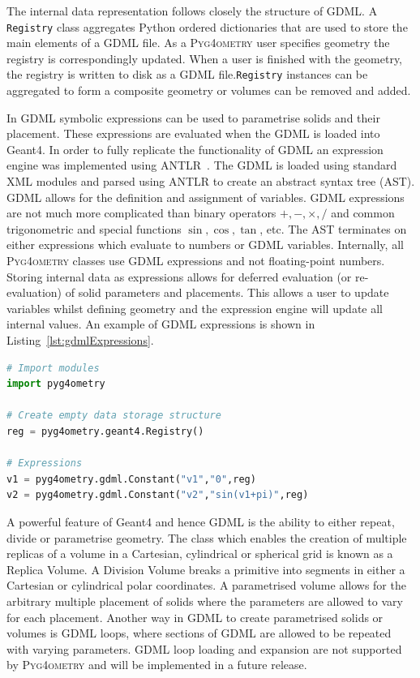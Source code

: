 \documentclass[final,5p,times,twocolumn]{elsarticle}
\newcommand{\PYGEOMETRY}{\textsc{Pyg4ometry}}
\begin{document}
The internal data representation follows closely the structure of GDML. A \verb|Registry| class aggregates Python ordered dictionaries that are  used to store the main 
elements of a GDML file. As a \PYGEOMETRY{} user specifies geometry the registry is correspondingly updated. When a user is finished with the geometry, the registry 
is written to disk as a GDML file.\verb|Registry| instances can be aggregated to form a composite geometry or volumes can be removed and added. 

In GDML symbolic expressions can be used to parametrise solids and their placement. These expressions are evaluated when the GDML is loaded into Geant4. 
In order to fully replicate the functionality of GDML an expression engine was implemented using ANTLR~\cite{10.5555/2501720}. The GDML is loaded using 
standard XML modules and parsed using ANTLR to create an abstract syntax tree (AST).  GDML allows for the definition 
and assignment of variables. GDML expressions are not much more complicated than binary operators $+, -, \times, /$ and common trigonometric and special 
functions $\sin, \cos, \tan$, etc. The AST terminates on either expressions which evaluate to numbers or GDML variables. Internally, all \PYGEOMETRY{} 
classes use GDML expressions and not floating-point numbers. Storing internal data as expressions allows for deferred evaluation (or re-evaluation) of 
solid parameters and  placements. This allows a user to update variables whilst defining geometry and the expression engine will update all internal values. 
An example of GDML expressions is shown in Listing~\ref{lst:gdmlExpressions}.

\begin{lstlisting}[caption={A simple Python script using \PYGEOMETRY{} to create GDML variables.},label={lst:gdmlExpressions}, language=Python]
# Import modules 
import pyg4ometry

# Create empty data storage structure
reg = pyg4ometry.geant4.Registry()

# Expressions 
v1 = pyg4ometry.gdml.Constant("v1","0",reg)
v2 = pyg4ometry.gdml.Constant("v2","sin(v1+pi)",reg)

\end{lstlisting}

 
A powerful feature of Geant4 and hence GDML is the ability to either repeat, divide or parametrise geometry. The class which enables the creation of 
multiple replicas of a volume in a Cartesian, cylindrical or spherical grid is known as a Replica Volume. A Division Volume breaks a primitive into segments 
in either a Cartesian or cylindrical polar coordinates. A parametrised volume allows for the arbitrary multiple placement of solids where the parameters are 
allowed to vary for each placement.  Another way in GDML to create parametrised solids or volumes is GDML loops, where sections of GDML are allowed 
to be repeated with varying parameters. GDML loop loading and expansion are not supported by \PYGEOMETRY{} and will be implemented in a 
future release.
  
\end{document}
